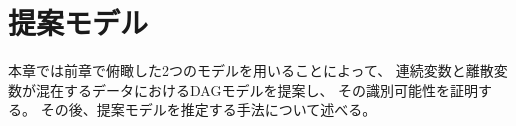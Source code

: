 
\section{提案モデル}
\label{part:proposal}

本章では前章で俯瞰した2つのモデル\cite{Shimizu2006-yu}\cite{Park2017-hw}を用いることによって、
連続変数と離散変数が混在するデータにおけるDAGモデルを提案し、
その識別可能性を証明する。
その後、提案モデルを推定する手法について述べる。

%

%

